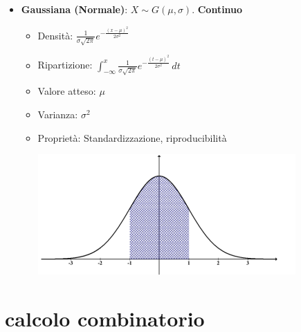 \documentclass{article}
\begin{document}
\begin{itemize}
    \item \textbf{Gaussiana (Normale)}: $X \sim G(\mu, \sigma)$. \textbf{Continuo}
    \begin{itemize}
        \item Densità: $\frac{1}{\sigma \sqrt{2\pi}} e^{-\frac{(x - \mu)^2}{2\sigma^2}}$
        \item Ripartizione: $\int_{-\infty}^{x} \frac{1}{\sigma \sqrt{2\pi}} e^{-\frac{(t - \mu)^2}{2\sigma^2}} \, dt$
        \item Valore atteso: $\mu$
        \item Varianza: $\sigma^2$
        \item Proprietà: Standardizzazione, riproducibilità
        \begin{center}
            \includegraphics[width=0.4\linewidth]{./immagini/gaussiano.png}
        \end{center}
    \end{itemize}
\end{itemize}

\section{calcolo combinatorio}
\end{document}
